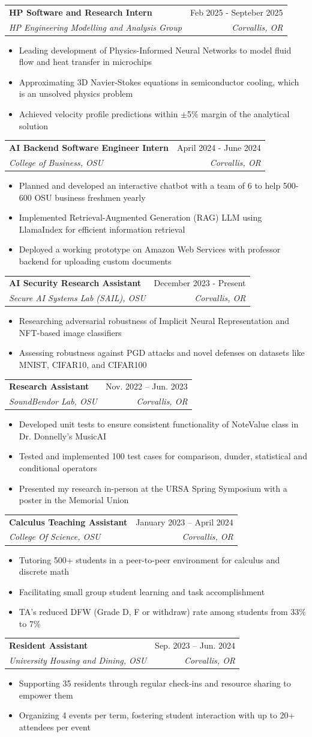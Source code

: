 \documentclass[letterpaper,11pt]{article}
\makeatletter
\newcommand{\resumeItem}[1]{
\item\small{
    {#1 \vspace{-2pt}}
  }
}
\newcommand{\resumeSubheading}[4]{
  \vspace{-2pt}
\item
  \begin{tabular*}{0.97\textwidth}[t]{l@{\extracolsep{\fill}}r}
    \textbf{#1} & #2 \\
    \textit{\small#3} & \textit{\small #4} \\
  \end{tabular*}\vspace{-7pt}
}
\newcommand{\resumeItemListStart}{
\begin{itemize}}
\newcommand{\resumeItemListEnd}{
\end{itemize}\vspace{-5pt}}
\makeatother
\begin{document}
\resumeSubheading
{HP Software and Research Intern}{Feb 2025 - Septeber 2025}
{HP Engineering Modelling and Analysis Group}{Corvallis, OR}
\resumeItemListStart
\resumeItem{Leading development of Physics-Informed Neural Networks to model fluid flow and heat transfer in microchips}
\resumeItem{Approximating 3D Navier-Stokes equations in semiconductor cooling, which is an unsolved physics problem}
\resumeItem{Achieved velocity profile predictions within $\pm$5\% margin of the analytical solution}
\resumeItemListEnd

\resumeSubheading
{AI Backend Software Engineer Intern}{April 2024 - June 2024}
{College of Business, OSU}{Corvallis, OR}
\resumeItemListStart
\resumeItem{Planned and developed an interactive chatbot with a team of 6 to help 500-600 OSU business freshmen yearly}
\resumeItem{Implemented Retrieval-Augmented Generation (RAG) LLM using LlamaIndex for efficient information retrieval}
\resumeItem{Deployed a working prototype on Amazon Web Services with professor backend for uploading custom documents}
\resumeItemListEnd

\resumeSubheading
{AI Security Research Assistant}{December 2023 - Present}
{Secure AI Systems Lab (SAIL), OSU}{Corvallis, OR}
\resumeItemListStart
\resumeItem{Researching adversarial robustness of Implicit Neural Representation and NFT-based image classifiers}
\resumeItem{Assessing robustness against PGD attacks and novel defenses on datasets like MNIST, CIFAR10, and CIFAR100}
\resumeItemListEnd

\resumeSubheading
{Research Assistant}{Nov. 2022 -- Jun. 2023}
{SoundBendor Lab, OSU}{Corvallis, OR}
\resumeItemListStart
\resumeItem{Developed unit tests to ensure consistent functionality of NoteValue class in Dr. Donnelly's MusicAI}
\resumeItem{Tested and implemented 100 test cases for comparison, dunder, statistical and conditional operators}
\resumeItem{Presented my research in-person at the URSA Spring Symposium with a poster in the Memorial Union}
\resumeItemListEnd

\resumeSubheading
{Calculus Teaching Assistant}{January 2023 -- April 2024}
{College Of Science, OSU}{Corvallis, OR}
\resumeItemListStart
\resumeItem{Tutoring 500+ students in a peer-to-peer environment for calculus and discrete math}
\resumeItem{Facilitating small group student learning and task accomplishment}
\resumeItem{TA's reduced DFW (Grade D, F or withdraw) rate among students from 33\% to 7\%}
\resumeItemListEnd

\resumeSubheading
{Resident Assistant}{Sep. 2023 -- Jun. 2024}
{University Housing and Dining, OSU}{Corvallis, OR}
\resumeItemListStart
\resumeItem{Supporting 35 residents through regular check-ins and resource sharing to empower them}
\resumeItem{Organizing 4 events per term, fostering student interaction with up to 20+ attendees per event}
\resumeItemListEnd
\end{document}

